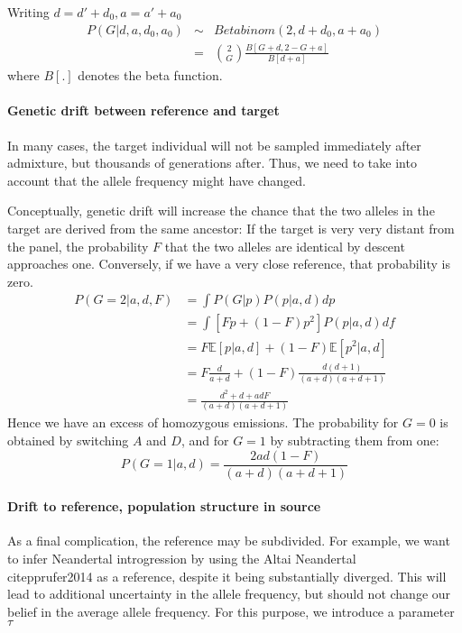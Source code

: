 \documentclass[10pt,a4paper]{article}
\newcommand{\BE}[1]{\mathbb{E}\left[#1\right]}
\begin{document}
Writing $d = d' + d_0, a = a'+a_0$
\begin{eqnarray}
P(G | d, a, d_0, a_0) &\sim& Betabinom(2, d+d_0, a+a_0)\nonumber\\
&=& \binom{2}{G} \frac{B[G+d, 2-G + a]}{B[ d + a]} \label{eq:ll:homo}
\end{eqnarray}
where $B[.]$ denotes the beta function.
\paragraph{Genetic drift between reference and target}
In many cases, the target individual will not be sampled immediately after admixture, but thousands of generations after. Thus, we need to take into account that the allele frequency might have changed.

Conceptually, genetic drift will increase the chance that the two alleles in the target are derived from the same ancestor: If the target is very very distant from the panel, the probability $F$ that the two alleles are identical by descent approaches one.  Conversely, if we have a very close reference, that probability is zero. 
\begin{align}
P(G=2 | a,d, F) &= \int P(G|p) P(p | a, d) dp \nonumber\\
&= \int \left[ F p + (1-F) p^2\right] P(p | a, d) df\nonumber\\
&= F \BE{p|a, d} + (1-F)  \BE{p^2|a, d}\\
&= F \frac{d}{a+d} + (1-F)  \frac{d (d+1)}{(a+d)(a+d+1)}\nonumber\\
&= \frac{d^2 + d + adF}{(a+d)(a+d+1)}
\end{align}
Hence we have an excess of homozygous emissions. The probability for $G=0$ is obtained by switching $A$ and $D$, and for $G=1$ by subtracting them from one:
\begin{equation}
P(G=1 | a,d) = \frac{2ad(1-F)}{(a+d)(a+d+1)}
\end{equation} 

\paragraph{Drift to reference, population structure in source}
As a final complication, the reference may be subdivided. For example, we want to infer Neandertal introgression by using the Altai Neandertal \\citep{prufer2014} as a reference, despite it being substantially diverged. This will lead to additional uncertainty in the allele frequency, but should not change our belief in the average allele frequency. For this purpose, we introduce a parameter $\tau$
\end{document}
